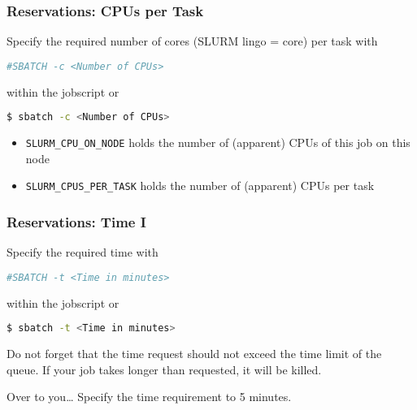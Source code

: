 \begin{frame}[fragile]
  \frametitle{Reservations: CPUs per Task}
  \vspace{-0.5em}
 Specify the required number of cores (SLURM lingo = core) per task with
\begin{lstlisting}[language=Bash,style=Shell]
#SBATCH -c <Number of CPUs>
\end{lstlisting}
within the jobscript or
\begin{lstlisting}[language=Bash,style=Shell]
$ sbatch -c <Number of CPUs>
\end{lstlisting}
\begin{itemize}
\item \verb+SLURM_CPU_ON_NODE+ holds the number of (apparent) CPUs of this job on this node
\item \verb+SLURM_CPUS_PER_TASK+ holds the number of (apparent) CPUs per task
\end{itemize}
  \vfill
\end{frame}

\begin{frame}[fragile]
  \frametitle{Reservations: Time I}
  Specify the required time with 
\begin{lstlisting}[language=Bash,style=Shell]
#SBATCH -t <Time in minutes>
\end{lstlisting}
within the jobscript or
\begin{lstlisting}[language=Bash,style=Shell]
$ sbatch -t <Time in minutes>
\end{lstlisting}
Do not forget that the time request should not exceed the time limit of the queue. If
your job takes longer than requested, it will be killed.
\begin{block}{Over to you\ldots}
  Specify the time requirement to 5 minutes.
\end{block}
  \vfill
\end{frame}

